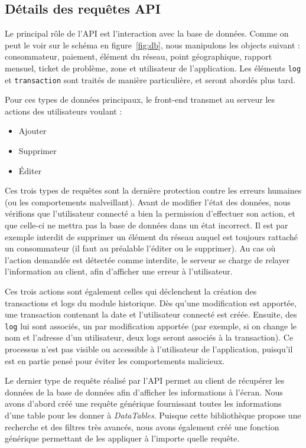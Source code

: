 \documentclass{EPL-master-thesis-covers-FR}
\begin{document}
			\subsection*{Détails des requêtes API}
				\label{sec:api}
				Le principal rôle de l'API est l'interaction avec la base de données. Comme on peut le voir sur le schéma en figure~\ref{fig:db}, nous manipulons les objects suivant : consommateur, paiement, élément du réseau, point géographique, rapport mensuel, ticket de problème, zone et utilisateur de l'application. Les éléments \texttt{log} et \texttt{transaction} sont traités de manière particulière, et seront abordés plus tard.

				Pour ces types de données principaux, le front-end transmet au serveur les actions des utilisateurs voulant :
				\begin{itemize}
					\item Ajouter
					\item Supprimer
					\item \'Editer
				\end{itemize}

				Ces trois types de requêtes sont la dernière protection contre les erreurs humaines (ou les comportements malveillant). Avant de modifier l'état des données, nous vérifions que l'utilisateur connecté a bien la permission d'effectuer son action, et que celle-ci ne mettra pas la base de données dans un état incorrect. Il est par exemple interdit de supprimer un élément du réseau auquel est toujours rattaché un consommateur (il faut au préalable l'éditer ou le supprimer). Au cas où l'action demandée est détectée comme interdite, le serveur se charge de relayer l'information au client, afin d'afficher une erreur à l'utilisateur.

				Ces trois actions sont également celles qui déclenchent la création des transactions et logs du module historique. Dès qu'une modification est apportée, une transaction contenant la date et l'utilisateur connecté est créée. Ensuite, des \texttt{log} lui sont associés, un par modification apportée (par exemple, si on change le nom et l'adresse d'un utilisateur, deux logs seront associés à la transaction). Ce processus n'est pas visible ou accessible à l'utilisateur de l'application, puisqu'il est en partie pensé pour éviter les comportements malicieux.

				Le dernier type de requête réalisé par l'API permet au client de récupérer les données de la base de données afin d'afficher les informations à l'écran. Nous avons d'abord créé une requête générique fournissant toutes les informations d'une table pour les donner à \emph{DataTables}. Puisque cette bibliothèque propose une recherche et des filtres très avancés, nous avons également créé une fonction générique permettant de les appliquer à l'importe quelle requête.
\end{document}
